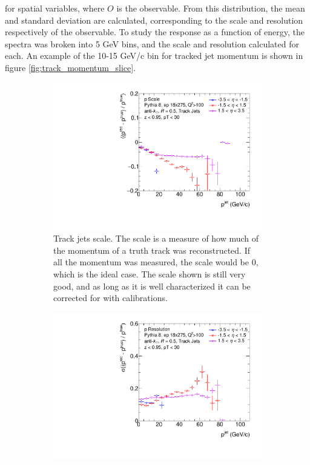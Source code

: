for spatial variables, where $O$ is the observable.  From this distribution, the mean and standard deviation are calculated, corresponding to the scale and resolution respectively of the observable.  To study the response as a function of energy, the spectra was broken into 5 GeV bins, and the scale and resolution calculated for each.  An example of the 10-15 GeV/c bin for tracked jet momentum is shown in figure \ref{fig:track_momentum_slice}.




\begin{figure}[h]
    \centering
    \begin{subfigure}{0.4\textwidth}
        \centering
        \includegraphics[width=\linewidth]{figs/Final_Plots/pScale_track_grouped.pdf}
        \caption{Track jets scale.  The scale is a measure of how much of the momentum of a truth track was reconstructed.  If all the momentum was measured, the scale would be 0, which is the ideal case.  The scale shown is still very good, and as long as it is well characterized it can be corrected for with calibrations.  }
        \label{fig:track_momentum_scale}
    \end{subfigure}
    \hfill
    \begin{subfigure}{0.4\textwidth}
        \centering
        \includegraphics[width=\linewidth]{figs/Final_Plots/pReso_track_grouped.pdf}

\end{subfigure}
\end{figure}
